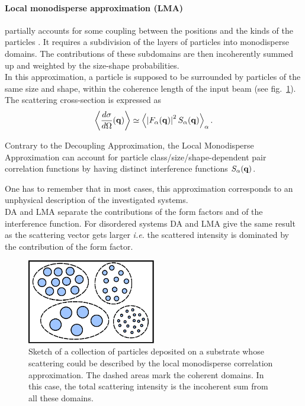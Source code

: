 \paragraph{Local monodisperse approximation (LMA)}
partially accounts for some coupling between the positions and the kinds of the particles \cite{Ped94}. 
 It requires a subdivision of the layers of particles into monodisperse domains. The contributions of these subdomains are then  incoherently summed up and weighted by the size-shape probabilities.\\ In this approximation, a particle is supposed to be surrounded by particles of the same size and shape, within the coherence length of the input beam (see fig.~\ref{fig:lma}). The scattering cross-section is expressed as
\begin{equation*}
  \left\langle \frac{d\sigma}{d\Omega}(\mathbf{q}) \right\rangle \simeq \left\langle \left\lvert F_\alpha(\mathbf{q})\right\rvert ^2 S_\alpha(\mathbf{q}) \right\rangle_\alpha.
\end{equation*}

Contrary to the Decoupling Approximation, the Local Monodisperse Approximation can account for particle class/size/shape-dependent pair correlation functions by having distinct interference functions $S_\alpha(\mathbf{q})$.

One has to remember that in most cases, this approximation corresponds to an unphysical description of the investigated systems. \\ 

DA and LMA separate the contributions of the form factors and of the interference function. For disordered systems DA and LMA give the same result as the scattering vector gets larger \textit{i.e.} the scattered intensity is dominated by the contribution of the form factor.

\begin{figure}[ht]
\begin{center}
\includegraphics[width=0.5\textwidth]{fig/drawing/drawingLMA.pdf}
\end{center}
\caption{Sketch of a collection of particles deposited on a substrate whose scattering could be described by the local monodisperse correlation approximation. The dashed areas mark the coherent domains. In this case, the total scattering intensity is the incoherent sum from all these domains.}
\label{fig:lma}
\end{figure}




